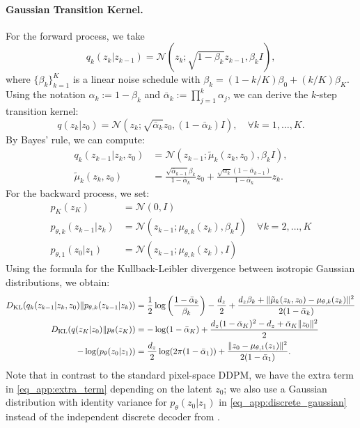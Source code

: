 \paragraph{Gaussian Transition Kernel.}
For the forward process, we take
\begin{equation}
    q_k(z_k| z_{k-1})=\mathcal{N}(z_k; \sqrt{1-\beta_k}z_{k-1}, \beta_k I),
\end{equation}
where $\{\beta_k\}_{k=1}^K$ is a linear noise schedule with $\beta_k = (1-k/K)\beta_0 + (k/K)\beta_K$. Using the notation $\alpha_{k}:=1-\beta_{k}$ and $\bar{\alpha}_{k}:=\prod_{j=1}^{k}\alpha_{j}$, we can derive the $k$-step transition kernel:
\begin{equation}
    q(z_k|z_0) = \mathcal{N}(z_k; \sqrt{\bar{\alpha}_k}z_0, (1-\bar{\alpha}_k)I), \quad \forall k=1,\ldots, K.
\end{equation}
By Bayes' rule, we can compute:
\begin{align}
    q_k(z_{k-1} | z_{k}, z_0) &= \mathcal{N}(z_{k-1}; \tilde{\mu}_k(z_k, z_0), \beta_k I), \\
    \tilde{\mu}_{k}(z_k,z_0) &= \frac{\sqrt{\bar{\alpha}_{k-1}}\beta_{k}}{1-\bar{\alpha}_{k}}{z}_{0}+\frac{\sqrt{\alpha_{k}}(1-\bar{\alpha}_{k-1})}{1-\bar{\alpha}_{k}}{z}_{k}.
\end{align}
For the backward process, we set:
\begin{align}
    p_K(z_K) &= \mathcal{N}(0, I) \\
    p_{\theta, k}(z_{k-1}|z_{k})&=\mathcal{N}(z_{k-1}; \mu_{\theta, k}(z_k), \beta_k I) \quad \forall k=2, \ldots, K \\
    p_{\theta, 1}(z_{0}|z_1) &= \mathcal{N}(z_{k-1}; \mu_{\theta, k}(z_k),I)
\end{align}
Using the formula for the Kullback-Leibler divergence between isotropic Gaussian distributions, we obtain:
\begin{align}
        D_{\mathrm{KL}} ({q_k(z_{k-1}| z_{k}, z_0)}\|{p_{\theta, k}(z_{k-1}|z_k)}) &=\frac{1}{2}\log\left(\frac{1-\bar{\alpha}_k}{{\beta}_k}\right)-\frac{d_z}{2}+\frac{d_z{\beta}_k+\|\tilde{\mu}_{k}(z_k,z_0)-\mu_{\theta, k}(z_k)\|^2}{2 (1-\bar{\alpha}_k)} \\
        D_{\mathrm{KL}}({q(z_K|z_0)}\|{p_\theta(z_K)})&=-\log(1-\bar{\alpha}_K)+\frac{d_z(1-\bar{\alpha}_K)^2-d_z+\bar{\alpha}_K\|{z_0}\|^2}{2} \label{eq_app:extra_term} \\
         -\log(p_\theta(z_0|z_1))&=\frac{d_z}{2}\log(2\pi (1-\bar{\alpha}_1))+\frac{\|z_0-\mu_{\theta, 1}(z_1)\|^2}{2(1-\bar{\alpha}_1)}\label{eq_app:discrete_gaussian}.
\end{align}
Note that in contrast to the standard pixel-space \gls*{DDPM}, we have the extra term in \eqref{eq_app:extra_term} depending on the latent $z_0$; we also use a Gaussian distribution with identity variance for $p_\theta (z_0|z_1)$ in \eqref{eq_app:discrete_gaussian} instead of the independent discrete decoder from \citet{hodenoisingdiffusionprobabilistic2020}. 

